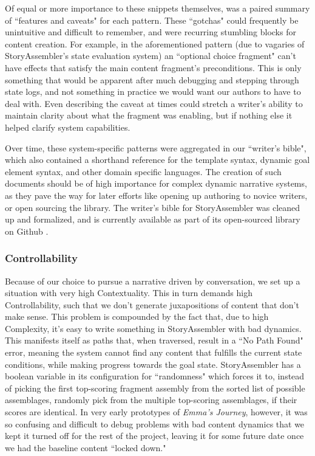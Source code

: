 
Of equal or more importance to these snippets themselves, was a paired summary of ``features and caveats" for each pattern. These ``gotchas" could frequently be unintuitive and difficult to remember, and were recurring stumbling blocks for content creation. For example, in the aforementioned pattern (due to vagaries of StoryAssembler's state evaluation system) an ``optional choice fragment" can't have effects that satisfy the main content fragment's preconditions. This is only something that would be apparent after much debugging and stepping through state logs, and not something in practice we would want our authors to have to deal with. Even describing the caveat at times could stretch a writer's ability to maintain clarity about what the fragment was enabling, but if nothing else it helped clarify system capabilities.

Over time, these system-specific patterns were aggregated in our ``writer's bible", which also contained a shorthand reference for the template syntax, dynamic goal element syntax, and other domain specific languages. The creation of such documents should be of high importance for complex dynamic narrative systems, as they pave the way for later efforts like opening up authoring to novice writers, or open sourcing the library. The writer's bible for StoryAssembler was cleaned up and formalized, and is currently available as part of its open-sourced library on Github \cite{github_storyassembler}.


\subsubsection{Controllability}

Because of our choice to pursue a narrative driven by conversation, we set up a situation with 
very high Contextuality. This in turn demands high Controllability, such that we don't generate juxapositions of content that don't make sense. This problem is compounded by the fact that, due to high Complexity, it's easy to write something in StoryAssembler with bad dynamics. This manifests itself as paths that, when traversed, result in a ``No Path Found" error, meaning the system cannot find any content that fulfills the current state conditions, while making progress towards the goal state. StoryAssembler has a boolean variable in its configuration for ``randomness" which forces it to, instead of picking the first top-scoring fragment assembly from the sorted list of possible assemblages, randomly pick from the multiple top-scoring assemblages, if their scores are identical. In very early prototypes of \textit{Emma's Journey}, however, it was so confusing and difficult to debug problems with bad content dynamics that we kept it turned off for the rest of the project, leaving it for some future date once we had the baseline content ``locked down."

